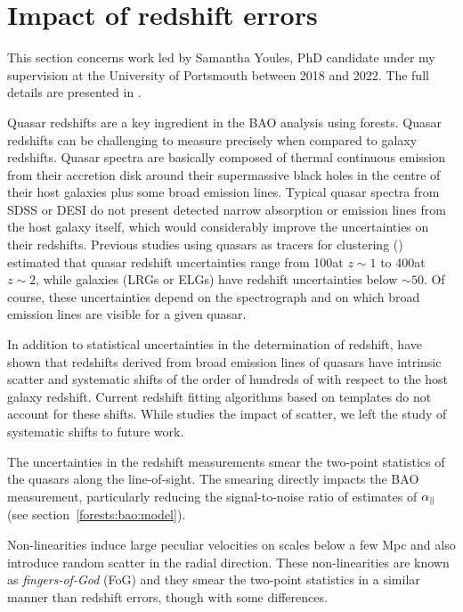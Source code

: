 \section{Impact of redshift errors}
\label{forests:zerrors}

This section concerns work led by Samantha Youles, PhD candidate under 
my supervision at the University of Portsmouth between 2018 and 2022. 
The full details are presented in \cite{youlesEffectQuasarRedshift2022}. 

Quasar redshifts are a key ingredient in the BAO analysis using forests. 
Quasar redshifts can be challenging to measure precisely when compared to galaxy redshifts. 
Quasar spectra are basically composed of thermal continuous emission 
from their accretion disk around their supermassive
black holes in the centre of their host galaxies plus some broad emission lines. 
Typical quasar spectra from SDSS or DESI do not present detected narrow absorption or 
emission lines from the host galaxy itself, which would considerably improve the 
uncertainties on their redshifts. Previous studies using quasars as tracers for 
clustering (\cite{zarroukClusteringSDSSIVExtended2018, lykeSloanDigitalSky2020}) 
estimated that quasar redshift uncertainties range from 
100\kms at $z\sim 1$ to 400\kms at $z\sim 2$, while galaxies (LRGs or ELGs) have 
redshift uncertainties below $\sim 50$\kms. Of course, these uncertainties 
depend on the spectrograph and on which broad emission lines are visible
for a given quasar. 

In addition to statistical uncertainties in the determination of redshift, 
\cite{shenSloanDigitalSky2016} have shown that redshifts derived from 
broad emission lines of quasars have intrinsic scatter and systematic shifts
of the order of hundreds of \kms with respect to the host galaxy redshift. 
Current redshift fitting algorithms based on templates do not account for these shifts. 
While \cite{youlesEffectQuasarRedshift2022} studies the impact of scatter, 
we left the study of systematic shifts to future work. 


The uncertainties in the redshift measurements smear the two-point statistics 
of the quasars  along the line-of-sight. The smearing directly 
impacts the BAO measurement, particularly reducing the signal-to-noise ratio 
of estimates of ${\alpha_\parallel}$ (see section~\ref{forests:bao:model}). 

Non-linearities induce large peculiar velocities on scales below a few Mpc
and also introduce random scatter in the radial direction.
These non-linearities are known as \emph{fingers-of-God} (FoG) and they smear
the two-point statistics in a similar manner than redshift errors, though 
with some differences. 

